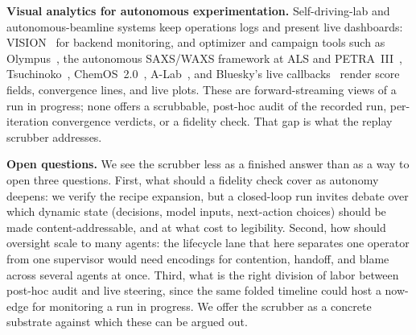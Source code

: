 \textbf{Visual analytics for autonomous experimentation.}
Self-driving-lab and autonomous-beamline systems keep operations logs and present
live dashboards: VISION~\cite{vision2025} for backend monitoring, and optimizer
and campaign tools such as Olympus~\cite{olympus2021}, the autonomous SAXS/WAXS
framework at ALS and PETRA~III~\cite{alspetra2026}, Tsuchinoko~\cite{tsuchinoko},
ChemOS~2.0~\cite{chemos2}, A-Lab~\cite{alab2023}, and Bluesky's live
callbacks~\cite{bluesky} render score fields, convergence lines, and live plots.
These are forward-streaming views of a run in progress; none offers a scrubbable,
post-hoc audit of the recorded run, per-iteration convergence verdicts, or a
fidelity check. That gap is what the replay scrubber addresses.

\textbf{Open questions.}
We see the scrubber less as a finished answer than as a way to open three
questions. First, what should a fidelity check cover as autonomy deepens: we
verify the recipe expansion, but a closed-loop run invites debate over which
dynamic state (decisions, model inputs, next-action choices) should be made
content-addressable, and at what cost to legibility. Second, how should oversight
scale to many agents: the lifecycle lane that here separates one operator from one
supervisor would need encodings for contention, handoff, and blame across several
agents at once. Third, what is the right division of labor between post-hoc audit
and live steering, since the same folded timeline could host a now-edge for
monitoring a run in progress. We offer the
scrubber as a concrete substrate against which these can be argued out.
